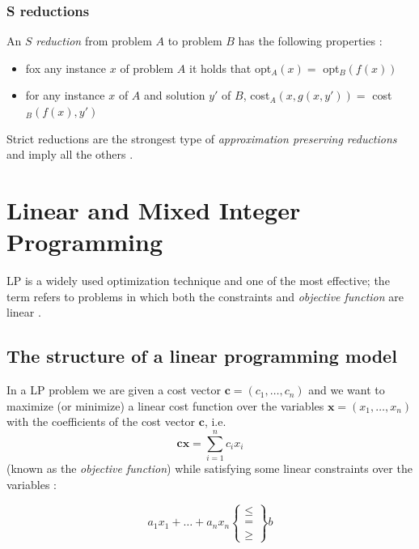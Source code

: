 \subsubsection{S reductions}%
\label{sub:strict_reductions}

An $S$ \emph{reduction} from problem $A$ to problem $B$ has the following properties \cite{Crescenzi1997ASG}:
\begin{itemize}
	\item fox any instance $x$ of problem $A$ it holds that opt$_{A} (x) = $ opt$_{B} (f(x))$
	\item for any instance $x$ of $A$ and solution $y'$ of $B$, cost$_{A} (x,
		      g(x, y')) = $ cost$_{B} (f(x), y')$
\end{itemize}

Strict reductions are the strongest type of \emph{approximation preserving
	reductions} and imply all the others \cite{Crescenzi1997ASG}.

\clearpage

\section{Linear and Mixed Integer Programming}%
\label{sec:linear_and_mixed_integer_programming}

\acrlong{LP} is a widely used optimization technique and one of the most
effective; the term refers to problems in which both the constraints and \emph{objective
	function} are linear
\cite{Edgar2001}\cite{Vanderbei2008}\cite{Dantzig1998}\cite{Martin1998}.

\subsection{The structure of a linear programming model}%
\label{sub:the_structure_of_a_linear_programming_model}

In a \acrfull{LP} problem we are given a cost vector $ \mathbf{c} = (c_1,
	\dots, c_n) $ and we want to maximize (or minimize) a linear cost function over
the variables $ \mathbf{x} = (x_1, \dots, x_n) $ with the coefficients of the
cost vector $ \mathbf{c} $, i.e.
\begin{equation*}
	\mathbf{cx} = \sum^{n}_{i=1} c_i x_i
\end{equation*}
(known as the \emph{objective function}) while satisfying some linear
constraints over the variables \cite{Bertsimas1997}\cite{Vanderbei2008}:

\begin{equation*}
	a_1 x_1 + \dots + a_n x_n \begin{Bmatrix} \leq \\ = \\ \geq \end{Bmatrix} b
\end{equation*}

